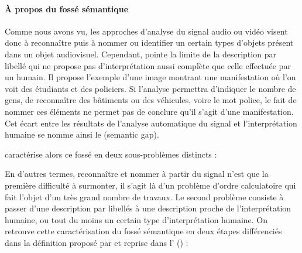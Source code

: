 

\paragraph{À propos du fossé sémantique}
Comme nous avons vu, les approches d'analyse du signal audio ou vidéo visent donc à reconnaître puis à nommer ou identifier un certain types d'objets présent dans un objet audiovisuel. 
Cependant, \cite{hare:semantic-gap} pointe la limite de la description par libellé qui ne propose pas d'interprétation aussi complète que celle effectuée par un humain. 
Il propose l'exemple d'une image montrant une manifestation où l'on voit des étudiants et des policiers. 
Si l'analyse permettra d'indiquer le nombre de gens, de reconnaître des bâtiments ou des véhicules, voire le mot police, le fait de nommer ces éléments ne permet pas de conclure qu'il s'agit d'une manifestation. 
Cet écart entre les résultats de l'analyse automatique du signal et l'interprétation humaine se nomme ainsi le  (semantic gap). 


\citeauthor{hare:semantic-gap} caractérise alors ce fossé en deux sous-problèmes distincts : 


En d'autres termes, reconnaître et nommer à partir du signal n'est que la première difficulté à surmonter, il s'agit là d'un problème d'ordre calculatoire qui fait l'objet d'un très grand nombre de travaux.
Le second problème consiste à passer d'une description par libellés à une description proche de l'interprétation humaine, ou tout du moins un certain type d'interprétation humaine. 
On retrouve cette caractérisation du fossé sémantique en deux étapes différenciés dans la définition proposé par \cite{Smeulders2000} et reprise dans l' (\cite{Furht2008}) :  %


